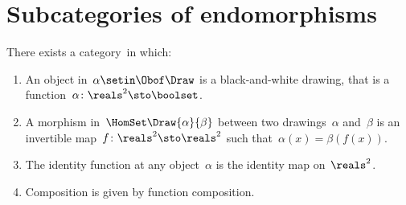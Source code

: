 
\section{Subcategories of endomorphisms}
\label{sec:Draw}

\begin{definition}[Drawings]
    There exists a category~\Draw in which:
    \begin{enumerate}
        \item An object in~$\alpha\setin \Obof\Draw$ is a black-and-white drawing,
              that is a function~$\alpha \colon \reals^2 \sto \boolset$.
        \item A morphism in~$\HomSet\Draw{\alpha}{\beta}$ between two drawings~$\alpha$ and~$\beta$ is an invertible map~$f\colon \reals^2 \sto \reals^2$ such that~$\alpha(x) = \beta(f(x))$.
        \item The identity function at any object~$\alpha$ is the identity map on~$\reals^2$.
        \item Composition is given by function composition.
    \end{enumerate}
\end{definition}

